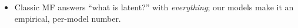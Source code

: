 \begin{itemize}
    \item Classic MF answers ``what is latent?'' with \emph{everything}; our models make it an empirical, per-model number. 

\end{itemize}
